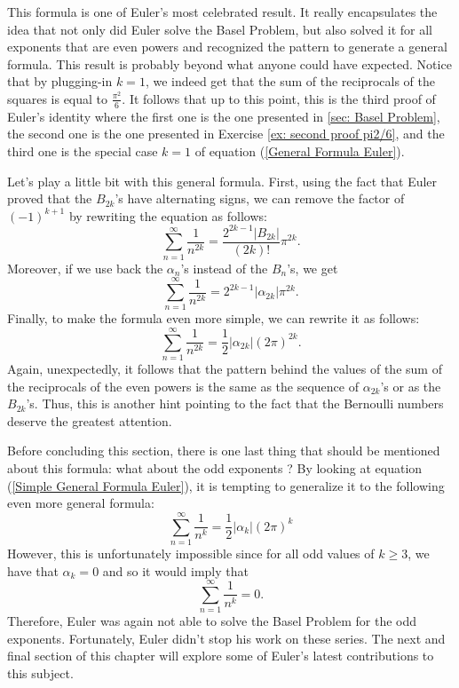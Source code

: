 This formula is one of Euler's most celebrated result. It really encapsulates the idea that not only did Euler solve the Basel Problem, but also solved it for all exponents that are even powers and recognized the pattern to generate a general formula. This result is probably beyond what anyone could have expected. Notice that by plugging-in $k = 1$, we indeed get that the sum of the reciprocals of the squares is equal to $\frac{\pi^2}{6}$. It follows that up to this point, this is the third proof of Euler's identity where the first one is the one presented in \autoref{sec: Basel Problem}, the second one is the one presented in Exercise \ref{ex: second proof pi2/6}, and the third one is the special case $k = 1$ of equation (\ref{General Formula Euler}).

Let's play a little bit with this general formula. First, using the fact that Euler proved that the $B_{2k}$'s have alternating signs, we can remove the factor of $(-1)^{k+1}$ by rewriting the equation as follows:
\begin{equation}
    \sum_{n=1}^{\infty}\frac{1}{n^{2k}} = \frac{2^{2k-1} |B_{2k}|}{(2k)!}\pi^{2k}.
\end{equation}
Moreover, if we use back the $\alpha_n$'s instead of the $B_n$'s, we get
\begin{equation}
    \sum_{n=1}^{\infty}\frac{1}{n^{2k}} = 2^{2k-1} |\alpha_{2k}|\pi^{2k}.
\end{equation}
Finally, to make the formula even more simple, we can rewrite it as follows:
\begin{equation} \label{Simple General Formula Euler}
    \sum_{n=1}^{\infty}\frac{1}{n^{2k}} = \frac{1}{2} |\alpha_{2k}|(2\pi)^{2k}.
\end{equation}
Again, unexpectedly, it follows that the pattern behind the values of the sum of the reciprocals of the even powers is the same as the sequence of $\alpha_{2k}$'s or as the $B_{2k}$'s. Thus, this is another hint pointing to the fact that the Bernoulli numbers deserve the greatest attention.

Before concluding this section, there is one last thing that should be mentioned about this formula: what about the odd exponents ? By looking at equation (\ref{Simple General Formula Euler}), it is tempting to generalize it to the following even more general formula:
$$\sum_{n=1}^{\infty}\frac{1}{n^k} = \frac{1}{2}|\alpha_k|(2\pi)^k$$
However, this is unfortunately impossible since for all odd values of $k \geq 3$, we have that $\alpha_k = 0$ and so it would imply that
$$\sum_{n=1}^{\infty}\frac{1}{n^k} = 0.$$
Therefore, Euler was again not able to solve the Basel Problem for the odd exponents. Fortunately, Euler didn't stop his work on these series. The next and final section of this chapter will explore some of Euler's latest contributions to this subject. \\

